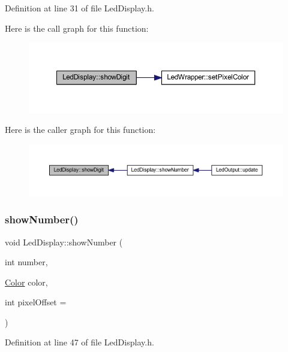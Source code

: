 Definition at line 31 of file Led\+Display.\+h.

Here is the call graph for this function\+:
\nopagebreak
\begin{figure}[H]
\begin{center}
\leavevmode
\includegraphics[width=350pt]{class_led_display_a4e8fd0added33e4ba163bff5bbc8cd69_cgraph}
\end{center}
\end{figure}
Here is the caller graph for this function\+:
\nopagebreak
\begin{figure}[H]
\begin{center}
\leavevmode
\includegraphics[width=350pt]{class_led_display_a4e8fd0added33e4ba163bff5bbc8cd69_icgraph}
\end{center}
\end{figure}
\mbox{\label{class_led_display_a673f0b08b216cc8a02a8a70fbbc54687}} 
\subsubsection{\texorpdfstring{show\+Number()}{showNumber()}}
{\footnotesize\ttfamily void Led\+Display\+::show\+Number (\begin{DoxyParamCaption}\item[{int}]{number,  }\item[{\hyperlink{struct_color}{Color}}]{color,  }\item[{int}]{pixel\+Offset = {} }\end{DoxyParamCaption})\hspace{0.3cm}{\ttfamily [inline]}}



Definition at line 47 of file Led\+Display.\+h.

